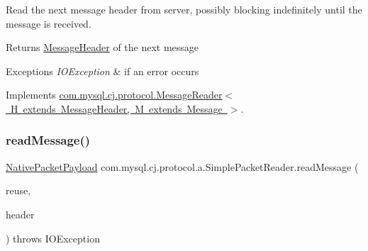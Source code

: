 Read the next message header from server, possibly blocking indefinitely until the message is received.

\begin{DoxyReturn}{Returns}
\mbox{\hyperlink{interfacecom_1_1mysql_1_1cj_1_1protocol_1_1_message_header}{Message\+Header}} of the next message 
\end{DoxyReturn}

\begin{DoxyExceptions}{Exceptions}
{\em I\+O\+Exception} & if an error occurs \\
\hline
\end{DoxyExceptions}


Implements \mbox{\hyperlink{interfacecom_1_1mysql_1_1cj_1_1protocol_1_1_message_reader_a09745b0e30f74fa13e2b32f22ce70cbb}{com.\+mysql.\+cj.\+protocol.\+Message\+Reader$<$ H extends Message\+Header, M extends Message $>$}}.

\mbox{\label{classcom_1_1mysql_1_1cj_1_1protocol_1_1a_1_1_simple_packet_reader_a088f75ed6453acc78366cfb88b7b15a0}} 
\subsubsection{\texorpdfstring{read\+Message()}{readMessage()}}
{\footnotesize\ttfamily \mbox{\hyperlink{classcom_1_1mysql_1_1cj_1_1protocol_1_1a_1_1_native_packet_payload}{Native\+Packet\+Payload}} com.\+mysql.\+cj.\+protocol.\+a.\+Simple\+Packet\+Reader.\+read\+Message (\begin{DoxyParamCaption}\item[{Optional$<$ \mbox{\hyperlink{classcom_1_1mysql_1_1cj_1_1protocol_1_1a_1_1_native_packet_payload}{Native\+Packet\+Payload}} $>$}]{reuse,  }\item[{\mbox{\hyperlink{classcom_1_1mysql_1_1cj_1_1protocol_1_1a_1_1_native_packet_header}{Native\+Packet\+Header}}}]{header }\end{DoxyParamCaption}) throws I\+O\+Exception}

\mbox{\label{classcom_1_1mysql_1_1cj_1_1protocol_1_1a_1_1_simple_packet_reader_a2dc67eb25eaee9e611b6fe3e9876877a}} 
